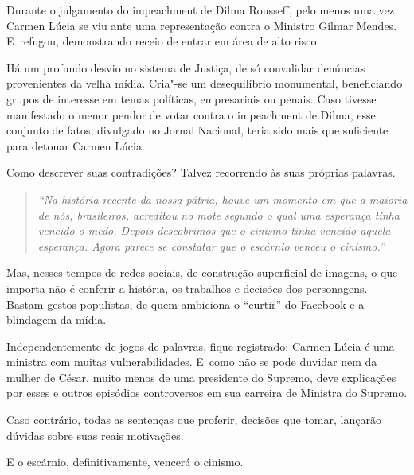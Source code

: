 Durante o julgamento do impeachment de Dilma Rousseff, pelo menos uma
vez Carmen Lúcia se viu ante uma representação contra o Ministro Gilmar
Mendes. E~refugou, demonstrando receio de entrar em área de alto risco.

Há um profundo desvio no sistema de Justiça, de só convalidar denúncias
provenientes da velha mídia. Cria"-se um desequilíbrio monumental,
beneficiando grupos de interesse em temas políticas, empresariais ou
penais. Caso tivesse manifestado o menor pendor de votar contra o
impeachment de Dilma, esse conjunto de fatos, divulgado no Jornal
Nacional, teria sido mais que suficiente para detonar Carmen Lúcia.

Como descrever suas contradições? Talvez recorrendo às suas próprias
palavras.

\begin{quote}
\emph{``Na história recente da nossa pátria, houve um momento em que a
maioria de nós, brasileiros, acreditou no mote segundo o qual uma
esperança tinha vencido o medo. Depois \redondo{[…]} descobrimos que o
cinismo tinha vencido aquela esperança. Agora parece se constatar que o
escárnio venceu o cinismo.''}
\end{quote}

 

Mas, nesses tempos de redes sociais, de construção superficial de
imagens, o que importa não é conferir a história, os trabalhos e
decisões dos personagens. Bastam gestos populistas, de quem ambiciona o
``curtir'' do Facebook e a blindagem da mídia.

Independentemente de jogos de palavras, fique registrado: Carmen Lúcia é
uma ministra com muitas vulnerabilidades. E~como não se pode duvidar nem
da mulher de César, muito menos de uma presidente do Supremo, deve
explicações por esses e outros episódios controversos em sua carreira de
Ministra do Supremo.

Caso contrário, todas as sentenças que proferir, decisões que tomar,
lançarão dúvidas sobre suas reais motivações.

E o escárnio, definitivamente, vencerá o cinismo.
